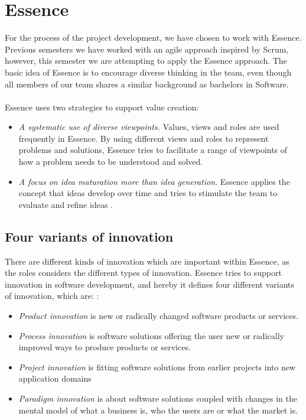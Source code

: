 \section{Essence}
For the process of the project development, we have chosen to work with Essence. 
Previous semesters we have worked with an agile approach inspired by Scrum, however, this semester we are attempting to apply the Essence approach.
The basic idea of Essence is to encourage diverse thinking in the team, even though all members of our team shares a similar background as bachelors in Software.
\\\\
Essence uses two strategies to support value creation:
\begin{itemize}
    \item \textit{A systematic use of diverse viewpoints.} 
    Values, views and roles are used frequently in Essence. 
    By using different views and roles to represent problems and solutions, Essence tries to facilitate a range of viewpoints of how a problem needs to be understood and solved.
    \item \textit{A focus on idea maturation more than idea generation.}
    Essence applies the concept that ideas develop over time and tries to stimulate the team to evaluate and refine ideas \autocite{Essence}.
\end{itemize}

\subsection{Four variants of innovation}
There are different kinds of innovation which are important within Essence, as the roles considers the different types of innovation. 
Essence tries to support innovation in software development, and hereby it defines four different variants of innovation, which are: \autocite{Essence}:
\begin{itemize}
    \item \textit{Product innovation} is new or radically changed software products or services. 
    \item \textit{Process innovation} is software solutions offering the user new or radically improved ways to produce products or services.
    \item \textit{Project innovation} is fitting software solutions from earlier projects into new application domains
    \item \textit{Paradigm innovation} is about software solutions coupled with changes in the mental model of what a business is, who the users are or what the market is.
\end{itemize}

